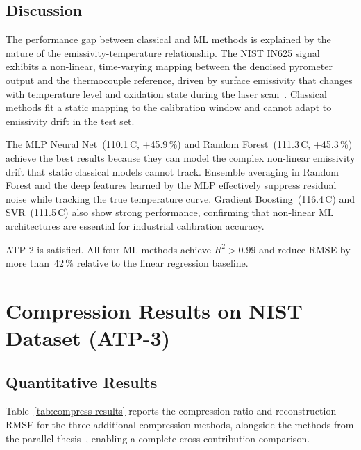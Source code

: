 \subsection{Discussion}

The performance gap between classical and ML methods is explained by the nature of the emissivity-temperature relationship. The NIST IN625 signal exhibits a non-linear, time-varying mapping between the denoised pyrometer output and the thermocouple reference, driven by surface emissivity that changes with temperature level and oxidation state during the laser scan~\cite{emissivity_measurement}. Classical methods fit a static mapping to the calibration window and cannot adapt to emissivity drift in the test set.

The MLP Neural Net~(110.1\,\textdegree C, +45.9\,\%) and Random Forest~(111.3\,\textdegree C, +45.3\,\%) achieve the best results because they can model the complex non-linear emissivity drift that static classical models cannot track. Ensemble averaging in Random Forest and the deep features learned by the MLP effectively suppress residual noise while tracking the true temperature curve. Gradient Boosting~(116.4\,\textdegree C) and SVR~(111.5\,\textdegree C) also show strong performance, confirming that non-linear ML architectures are essential for industrial calibration accuracy.

ATP-2 is satisfied. All four ML methods achieve $R^2 > 0.99$ and reduce RMSE by more than~42\,\% relative to the linear regression baseline.

\section{Compression Results on NIST Dataset (ATP-3)}
\label{sec:nist-compress}

\subsection{Quantitative Results}

Table~\ref{tab:compress-results} reports the compression ratio and reconstruction RMSE for the three additional compression methods, alongside the methods from the parallel thesis~\cite{sravya2026}, enabling a complete cross-contribution comparison.

